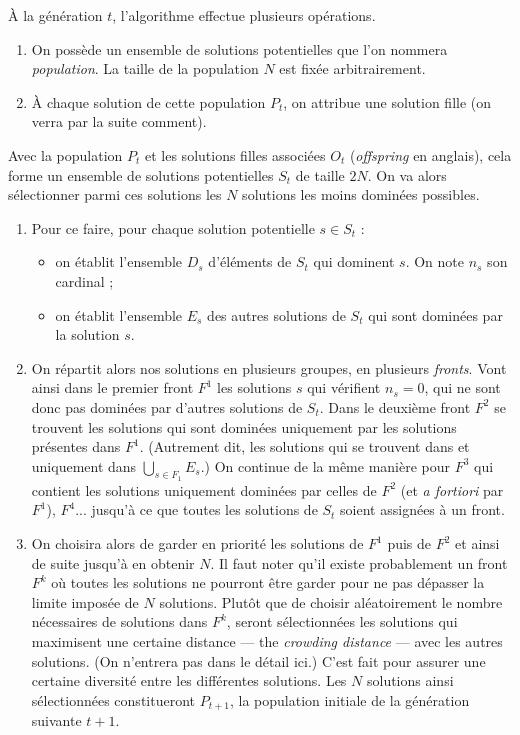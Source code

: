 À la génération $t$, l'algorithme effectue plusieurs opérations.
\begin{enumerate}
 \item On possède un ensemble de solutions potentielles que l'on nommera \emph{population}.
 La taille de la population $N$ est fixée arbitrairement.
 \item À chaque solution de cette population $P_t$, on attribue une solution fille (on verra par la suite comment). 
\end{enumerate}

 Avec la population $P_t$ et les solutions filles associées $O_t$ (\emph{offspring} en anglais), cela forme un ensemble de solutions potentielles $S_t$ de taille $2N$. 
 On va alors sélectionner parmi ces solutions les $N$ solutions les moins dominées possibles.
\begin{enumerate}[resume]
 \item Pour ce faire, pour chaque solution potentielle $s\in S_t$ :
 \begin{itemize}
  \item on établit l'ensemble $D_s$ d'éléments de $S_t$ qui dominent $s$. On note $n_s$ son cardinal ;
  \item on établit l'ensemble $E_s$ des autres solutions de $S_t$ qui sont dominées par la solution $s$.
 \end{itemize}
 \item On répartit alors nos solutions en plusieurs groupes, en plusieurs \emph{fronts}.
 Vont ainsi dans le premier front $F^1$ les solutions $s$ qui vérifient $n_s = 0$, qui ne sont donc pas dominées par d'autres solutions de $S_t$. 
 Dans le deuxième front $F^2$ se trouvent les solutions qui sont dominées uniquement par les solutions présentes dans $F^1$.
 (Autrement dit, les solutions qui se trouvent dans et uniquement dans $\bigcup_{s\in F_1} E_s$.)
 On continue de la même manière pour $F^3$ qui contient les solutions uniquement dominées par celles de $F^2$ (et \emph{a fortiori} par $F^1$), $F^4$... jusqu'à ce que toutes les solutions de $S_t$ soient assignées à un front.
 \item On choisira alors de garder en priorité les solutions de $F^1$ puis de $F^2$ et ainsi de suite jusqu'à en obtenir $N$. 
 Il faut noter qu'il existe probablement un front $F^k$ où toutes les solutions ne pourront être garder pour ne pas dépasser la limite imposée de $N$ solutions.
 Plutôt que de choisir aléatoirement le nombre nécessaires de solutions dans $F^k$, seront sélectionnées les solutions qui maximisent une certaine distance --- the \emph{crowding distance} --- avec les autres solutions.
 (On n'entrera pas dans le détail ici.)
 C'est fait pour assurer une certaine diversité entre les différentes solutions.
 Les $N$ solutions ainsi sélectionnées constitueront $P_{t+1}$, la population initiale de la génération suivante $t+1$.
\end{enumerate}

